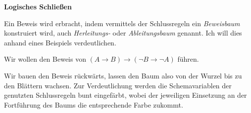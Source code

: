 \documentclass[8pt]{beamer}
\newcommand{\strong}[1]{\textsf{\textbf{#1}}}
\newcommand{\centerheadline}[1]{%
  \begin{center}\strong{#1}\end{center}}
\newcommand{\parspace}{\vspace{0.8em}}
\begin{document}
\begin{frame}
\centerheadline{Logisches Schließen}
\end{frame}

\begin{frame}[t]
\vspace{1em}
Ein Beweis wird erbracht, indem vermittels der Schlussregeln ein
\emph{Beweisbaum} konstruiert wird, auch \emph{Herleitungs-} oder
\emph{Ableitungsbaum} genannt. Ich will dies anhand eines Beispiels
verdeutlichen.

\parspace
Wir wollen den Beweis von $(A\to B)\to (\lnot B\to\lnot A)$ führen.

\parspace
Wir bauen den Beweis rückwärts, lassen den Baum also von der Wurzel
bis zu den Blättern wachsen. Zur Verdeutlichung werden die Schemavariablen
der genutzten Schlussregeln bunt eingefärbt, wobei der jeweiligen
Einsetzung an der Fortführung des Baums die entsprechende
Farbe zukommt.


\end{frame}
\end{document}
